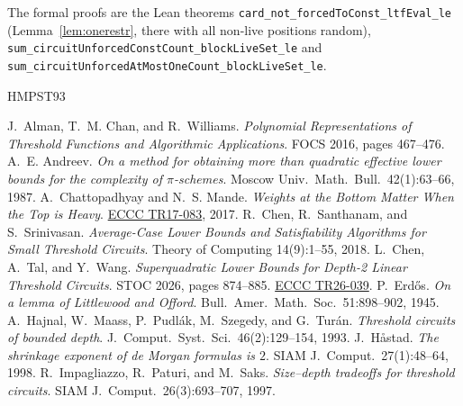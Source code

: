 \documentclass[11pt,letterpaper]{article}
\theoremstyle{remark}
\begin{document}
The formal proofs are the Lean theorems
\texttt{card\_not\_forcedToConst\_ltfEval\_le} (Lemma~\ref{lem:onerestr}, there
with all non-live positions random),
\texttt{sum\_circuitUnforcedConstCount\_blockLiveSet\_le} and
\texttt{sum\_circuitUnforcedAtMostOneCount\_blockLiveSet\_le}.

\begin{thebibliography}{HMPST93}

 J.~Alman, T.~M. Chan, and R.~Williams.
\emph{Polynomial Representations of Threshold Functions and Algorithmic
Applications}. FOCS 2016, pages 467--476.
 A.~E. Andreev. \emph{On a method for obtaining more
than quadratic effective lower bounds for the complexity of $\pi$-schemes}.
Moscow Univ.\ Math.\ Bull.\ 42(1):63--66, 1987.
 A.~Chattopadhyay and N.~S. Mande.
\emph{Weights at the Bottom Matter When the Top is Heavy}.
\href{https://eccc.weizmann.ac.il/report/2017/083/}{ECCC TR17-083}, 2017.
 R.~Chen, R.~Santhanam, and S.~Srinivasan.
\emph{Average-Case Lower Bounds and Satisfiability Algorithms for Small
Threshold Circuits}. Theory of Computing 14(9):1--55, 2018.
 L.~Chen, A.~Tal, and Y.~Wang.
\emph{Superquadratic Lower Bounds for Depth-2 Linear Threshold Circuits}.
STOC 2026, pages 874--885. \href{https://eccc.weizmann.ac.il/report/2026/039/}{ECCC TR26-039}.
 P.~Erd\H{o}s. \emph{On a lemma of Littlewood and Offord}.
Bull.\ Amer.\ Math.\ Soc.\ 51:898--902, 1945.
 A.~Hajnal, W.~Maass, P.~Pudl\'ak, M.~Szegedy, and
G.~Tur\'an. \emph{Threshold circuits of bounded depth}. J.\ Comput.\ Syst.\
Sci.\ 46(2):129--154, 1993.
 J.~H{\aa}stad. \emph{The shrinkage exponent of
de Morgan formulas is $2$}. SIAM J.\ Comput.\ 27(1):48--64, 1998.
\bibitem[IPS97]{IPS} R.~Impagliazzo, R.~Paturi, and M.~Saks. \emph{Size--depth tradeoffs for threshold circuits}. SIAM J.\ Comput.\ 26(3):693--707, 1997.


\end{thebibliography}
\end{document}
